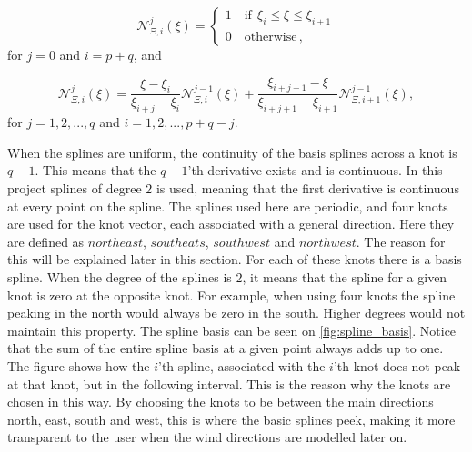 \begin{equation}
    \mathcal{N}_{\Xi,i}^j (\xi) =
    \begin{cases}
    1 \quad \text{if} \ \ \xi_i \leq \xi \leq \xi_{i+1}\\
    0 \quad \text{otherwise}\,,
    \end{cases}
    \end{equation}
    for $j = 0$ and $i = p + q$, and

    \begin{equation}
        \mathcal{N}_{\Xi,i}^j(\xi) = \frac{\xi-\xi_i}{\xi_{i+j}-\xi_i}\mathcal{N}_{\Xi,i}^{j-1}(\xi) + \frac{\xi_{i+j+1}-\xi}{\xi_{i+j+1}-\xi_{i+1}} \mathcal{N}_{\Xi, i + 1}^{j-1}(\xi),
    \end{equation}
    for $j = 1,2,..., q$ and $i = 1,2,..., p + q - j$.

\noindent When the splines are uniform, the continuity of the basis splines across a knot is $q-1$. This means that the $q-1$'th derivative exists and is continuous. In this project splines of degree $2$ is used, meaning that the first derivative is continuous at every point on the spline. The splines used here are periodic, and four knots are used for the knot vector, each associated with a general direction. Here they are defined as $northeast$, $southeats$, $southwest$ and $northwest$. The reason for this will be explained later in this section. For each of these knots there is a basis spline. When the degree of the splines is $2$, it means that the spline for a given knot is zero at the opposite knot. For example, when using four knots the spline peaking in the north would always be zero in the south. Higher degrees would not maintain this property. The spline basis can be seen on \cref{fig:spline_basis}. Notice that the sum of the entire spline basis at a given point always adds up to one. The figure shows how the $i$'th spline, associated with the $i$'th knot does not peak at that knot, but in the following interval. This is the reason why the knots are chosen in this way. By choosing the knots to be between the main directions north, east, south and west, this is where the basic splines peek, making it more transparent to the user when the wind directions are modelled later on.



